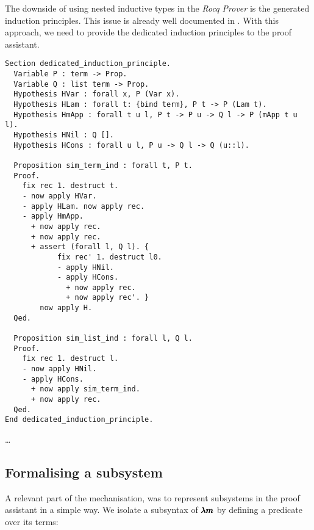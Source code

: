 
The downside of using nested inductive types in the \textit{Rocq Prover} is the generated induction principles.
This issue is already well documented in \cite{CoqArt}.
With this approach, we need to provide the dedicated induction principles to the proof assistant.

\begin{lstlisting}[language=Coq]
Section dedicated_induction_principle.
  Variable P : term -> Prop.
  Variable Q : list term -> Prop.
  Hypothesis HVar : forall x, P (Var x).
  Hypothesis HLam : forall t: {bind term}, P t -> P (Lam t).
  Hypothesis HmApp : forall t u l, P t -> P u -> Q l -> P (mApp t u l).
  Hypothesis HNil : Q [].
  Hypothesis HCons : forall u l, P u -> Q l -> Q (u::l).
  
  Proposition sim_term_ind : forall t, P t.
  Proof.
    fix rec 1. destruct t.
    - now apply HVar.
    - apply HLam. now apply rec.
    - apply HmApp.
      + now apply rec.
      + now apply rec.
      + assert (forall l, Q l). {
            fix rec' 1. destruct l0.
            - apply HNil.
            - apply HCons.
              + now apply rec.
              + now apply rec'. }          
        now apply H.
  Qed.      
  
  Proposition sim_list_ind : forall l, Q l.
  Proof.
    fix rec 1. destruct l.
    - now apply HNil.
    - apply HCons.
      + now apply sim_term_ind.
      + now apply rec.
  Qed.          
End dedicated_induction_principle.
\end{lstlisting}

\dots

\subsection{Formalising a subsystem}


A relevant part of the mechanisation, was to represent subsystems in the proof assistant in a simple way.
We isolate a subsyntax of $\pmb{\lambda m}$ by defining a predicate over its terms:

